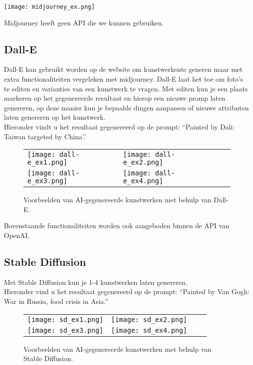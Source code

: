 \begin{center}
    \texttt{[image: midjourney\_ex.png]}
    \label{fig:midjourney_ex.png}
\end{center}

Midjourney heeft geen API die we kunnen gebruiken.

\subsection{ Dall-E}
Dall-E kan gebruikt worden op de website om kunstwerkente generen maar met extra functionaliteiten vergeleken met midjourney. Dall-E laat het toe om foto's te editen en varianties van een kunstwerk te vragen. Met editen kun je een plaats markeren op het gegenereerde resultaat en hierop een nieuwe promp laten genereren, op deze manier kun je bepaalde dingen aanpassen of nieuwe attributen laten genereren op het kunstwerk. \\

Hieronder vindt u het resultaat gegenereerd op de prompt: ``Painted by Dali: Taiwan targeted by China'.'

\begin{figure}[h!]
    \centering
    \begin{tabular}{llll}
        \texttt{[image: dall-e\_ex1.png]} &
        \texttt{[image: dall-e\_ex2.png]} \\
        \texttt{[image: dall-e\_ex3.png]} &
        \texttt{[image: dall-e\_ex4.png]}
    \end{tabular}
    \caption{Voorbeelden van AI-gegenereerde kunstwerken met behulp van Dall-E.}
    \label{fig:examples}
\end{figure}

 Bovenstaande functionaliteiten worden ook aangeboden binnen de API van OpenAI.

\subsection{Stable Diffusion}
Met Stable Diffusion kun je 1-4 kunstwerken laten genereren. \\

Hieronder vind u het resultaat gegenereerd op de prompt:  ``Painted by Van Gogh: War in Russia, food crisis in Asia.''

\begin{figure}[h!]
    \centering
    \begin{tabular}{llll}
        \texttt{[image: sd\_ex1.png]} &
        \texttt{[image: sd\_ex2.png]} \\
        \texttt{[image: sd\_ex3.png]} &
        \texttt{[image: sd\_ex4.png]}
    \end{tabular}
    \caption{Voorbeelden van AI-gegenereerde kunstwerken met behulp van Stable Diffusion.}
    \label{fig:examples}
\end{figure}


